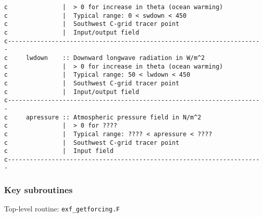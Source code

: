 {\begin{verbatim}
c               |  > 0 for increase in theta (ocean warming)
c               |  Typical range: 0 < swdown < 450
c               |  Southwest C-grid tracer point
c               |  Input/output field
c----------------------------------------------------------------------
c     lwdown    :: Downward longwave radiation in W/m^2
c               |  > 0 for increase in theta (ocean warming)
c               |  Typical range: 50 < lwdown < 450
c               |  Southwest C-grid tracer point
c               |  Input/output field
c----------------------------------------------------------------------
c     apressure :: Atmospheric pressure field in N/m^2
c               |  > 0 for ????
c               |  Typical range: ???? < apressure < ????
c               |  Southwest C-grid tracer point
c               |  Input field
c----------------------------------------------------------------------

\end{verbatim}
}


\subsubsection{Key subroutines
\label{sec:pkg:exf:subroutines}}

Top-level routine: \texttt{exf\_getforcing.F}

